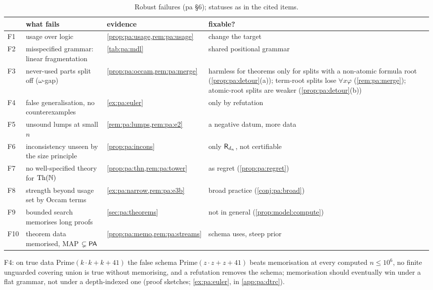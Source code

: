 \begin{table}[t]\centering\footnotesize\crefabbrev
\begin{tabularx}{\textwidth}{@{}l>{\raggedright\arraybackslash}X>{\raggedright\arraybackslash}p{}>{\raggedright\arraybackslash}p{}@{}}
\toprule
& what fails & evidence & fixable?\\
\midrule
F1 & usage over logic & \cref{prop:pa:usage,rem:pa:usage} & change the target\\
F2 & misspecified grammar: linear fragmentation & \cref{tab:pa:mdl} & shared positional grammar\\
F3 & never-used parts split off ($\omega$-gap) & \cref{prop:pa:occam,rem:pa:merge} & harmless for theorems only for splits with a non-atomic formula root (\cref{prop:pa:detour}(a)); term-root splits lose $\forall x\varphi$ (\cref{rem:pa:merge}); atomic-root splits are weaker (\cref{prop:pa:detour}(b))\\
F4 & false generalisation, no counterexamples & \cref{ex:pa:euler} & only by refutation\\
F5 & unsound lumps at small $n$ & \cref{rem:pa:lumps,rem:pa:e2} & a negative datum, more data\\
F6 & inconsistency unseen by the size principle & \cref{prop:pa:incons} & only $\mathsf{R}_{d_n}$, not certifiable\\
F7 & no well-specified theory for $\mathrm{Th}(\mathbb{N})$ & \cref{prop:pa:thn,rem:pa:tower} & as regret (\cref{prop:pa:regret})\\
F8 & strength beyond usage set by Occam terms & \cref{ex:pa:narrow,rem:pa:e3b} & broad practice (\cref{conj:pa:broad})\\
F9 & bounded search memorises long proofs & \cref{sec:pa:theorems} & not in general (\cref{prop:model:compute})\\
F10 & theorem data memorised, MAP $\subsetneq\mathsf{PA}$ & \cref{prop:pa:memo,rem:pa:streams} & schema uses, steep prior\\
\bottomrule
\end{tabularx}
\caption{Robust failures (pa \S6); statuses as in the cited items.}\label{tab:pa:failures}
\end{table}

\noindent F4: on true data $\mathrm{Prime}(k\cdot k+k+41)$ the false schema $\mathrm{Prime}(z\cdot z+z+41)$ beats memorisation at every computed $n\le10^6$, no finite unguarded covering union is true without memorising, and a refutation removes the schema; memorisation should eventually win under a flat grammar, not under a depth-indexed one (proof sketches; \cref{ex:pa:euler}, in \cref{app:pa:dtrc}).

